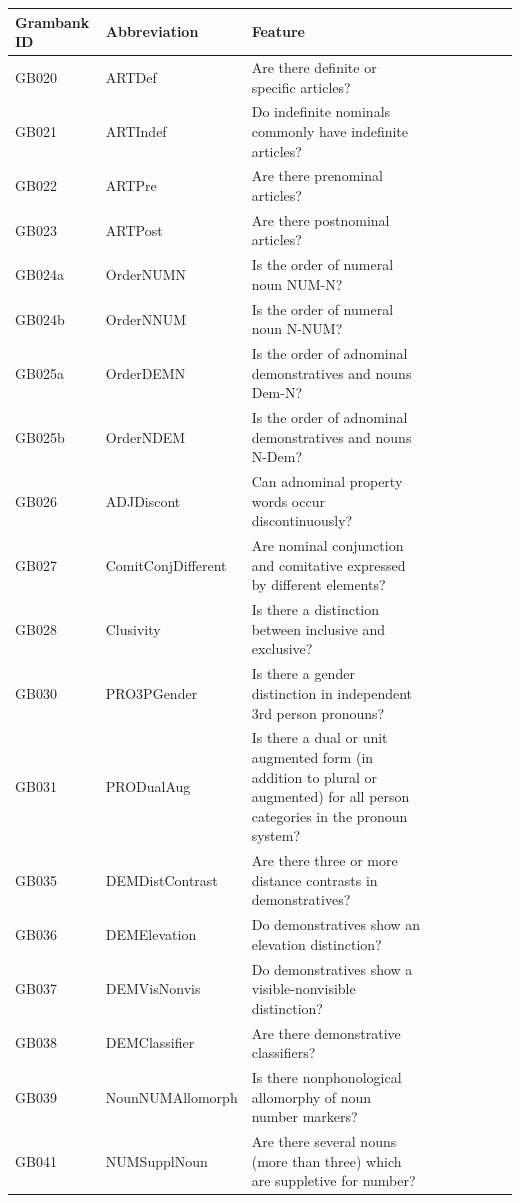 \documentclass[a4paper,10pt]{article} %
\begin{document}
\begin{landscape}
\begin{longtable}{| l | p{4cm}| p{12cm}|p{2cm}|p{2cm}|p{2cm}|p{2cm}|p{2cm}|p{2cm}|}
\hline
\textbf{Grambank ID} & \textbf{Abbreviation} & \textbf{Feature}\\ \hline
\endhead
GB020 & ARTDef&Are there definite or specific articles?\\ \hline
GB021 & ARTIndef&Do indefinite nominals commonly have indefinite articles?\\ \hline
GB022 & ARTPre&Are there prenominal articles?\\ \hline
GB023 & ARTPost&Are there postnominal articles?\\ \hline
GB024a & OrderNUMN&Is the order of numeral noun NUM-N?\\ \hline
GB024b & OrderNNUM&Is the order of numeral noun N-NUM?\\ \hline
GB025a & OrderDEMN&Is the order of adnominal demonstratives and nouns Dem-N?\\ \hline
GB025b & OrderNDEM&Is the order of adnominal demonstratives and nouns N-Dem?\\ \hline
GB026 & ADJDiscont&Can adnominal property words occur discontinuously?\\ \hline
GB027 & ComitConjDifferent&Are nominal conjunction and comitative expressed by different elements?\\ \hline
GB028 & Clusivity&Is there a distinction between inclusive and exclusive?\\ \hline
GB030 & PRO3PGender&Is there a gender distinction in independent 3rd person pronouns?\\ \hline
GB031 & PRODualAug&Is there a dual or unit augmented form (in addition to plural or augmented) for all person categories in the pronoun system?\\ \hline
GB035 & DEMDistContrast&Are there three or more distance contrasts in demonstratives?\\ \hline
GB036 & DEMElevation&Do demonstratives show an elevation distinction?\\ \hline
GB037 & DEMVisNonvis&Do demonstratives show a visible-nonvisible distinction?\\ \hline
GB038 & DEMClassifier&Are there demonstrative classifiers?\\ \hline
GB039 & NounNUMAllomorph&Is there nonphonological allomorphy of noun number markers?\\ \hline
GB041 & NUMSupplNoun&Are there several nouns (more than three) which are suppletive for number?\\ \hline

\end{longtable}
\end{landscape}
\end{document}
